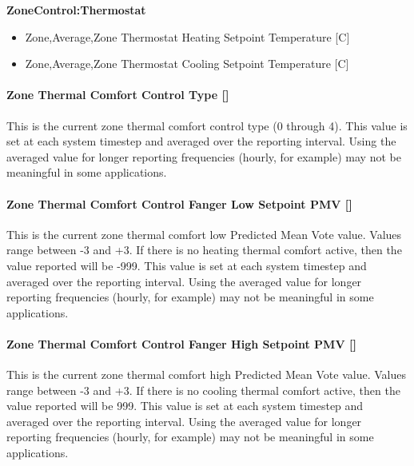 \textbf{ZoneControl:Thermostat}

\begin{itemize}
\item
  Zone,Average,Zone Thermostat Heating Setpoint Temperature {[}C{]}
\item
  Zone,Average,Zone Thermostat Cooling Setpoint Temperature {[}C{]}
\end{itemize}

\paragraph{Zone Thermal Comfort Control Type {[]}}\label{zone-thermal-comfort-control-type}

This is the current zone thermal comfort control type (0 through 4). This value is set at each system timestep and averaged over the reporting interval. Using the averaged value for longer reporting frequencies (hourly, for example) may not be meaningful in some applications.

\paragraph{Zone Thermal Comfort Control Fanger Low Setpoint PMV {[]}}\label{zone-thermal-comfort-control-fanger-low-setpoint-pmv}

This is the current zone thermal comfort low Predicted Mean Vote value. Values range between -3 and +3. If there is no heating thermal comfort active, then the value reported will be -999. This value is set at each system timestep and averaged over the reporting interval. Using the averaged value for longer reporting frequencies (hourly, for example) may not be meaningful in some applications.

\paragraph{Zone Thermal Comfort Control Fanger High Setpoint PMV {[]}}\label{zone-thermal-comfort-control-fanger-high-setpoint-pmv}

This is the current zone thermal comfort high Predicted Mean Vote value. Values range between -3 and +3. If there is no cooling thermal comfort active, then the value reported will be 999. This value is set at each system timestep and averaged over the reporting interval. Using the averaged value for longer reporting frequencies (hourly, for example) may not be meaningful in some applications.

